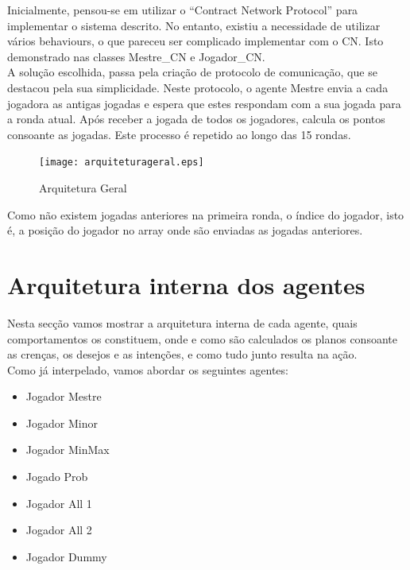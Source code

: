 \documentclass[12pt]{article}
\begin{document}
    Inicialmente, pensou-se em utilizar o “Contract Network Protocol” para implementar o sistema descrito. No entanto, existiu a necessidade de utilizar vários behaviours, o que pareceu ser complicado implementar com o CN. Isto demonstrado nas classes Mestre\_CN e Jogador\_CN.\\
    
    A solução escolhida, passa pela criação de protocolo de comunicação, que se destacou pela sua simplicidade. Neste protocolo, o agente Mestre envia a cada jogadora as antigas jogadas e espera que estes respondam com a sua jogada para a ronda atual. Após receber a jogada de todos os jogadores, calcula os pontos consoante as jogadas. Este processo é repetido ao longo das 15 rondas.\\
    	
	\begin{figure}[h]
		\centering
		\texttt{[image: arquiteturageral.eps]}
		\caption{Arquitetura Geral}
		\label{fig:arquiteturageral}
	\end{figure}
	
	
    Como não existem jogadas anteriores na primeira ronda, o índice do jogador, isto é, a posição do jogador no array onde são enviadas as jogadas anteriores.\\
	
	
	\section*{Arquitetura interna dos agentes}
	
    Nesta secção vamos mostrar a arquitetura interna de cada agente, quais comportamentos os constituem, onde e como são calculados os planos consoante as crenças, os desejos e as intenções, e como tudo junto resulta na ação.\\
    Como já interpelado, vamos abordar os seguintes agentes:\\

    \begin{itemize}
        \item Jogador Mestre
        \item Jogador Minor
        \item Jogador MinMax
        \item Jogado Prob
        \item Jogador All 1
        \item Jogador All 2
        \item Jogador Dummy
    \end{itemize}
	
\end{document}
